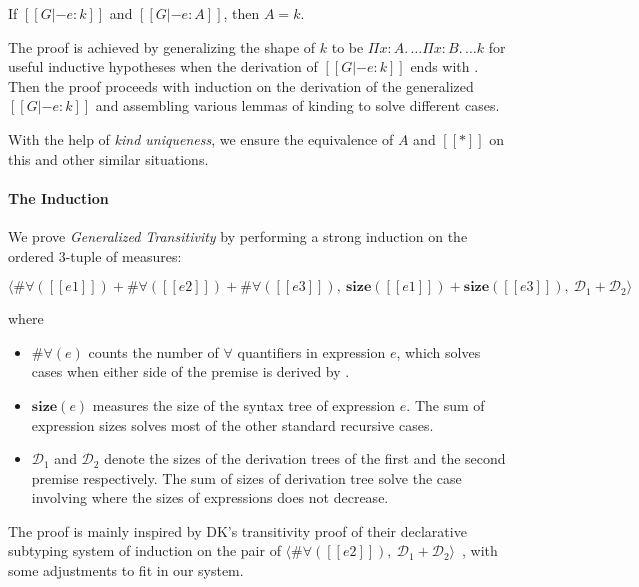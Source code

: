 \begin{theorem}
    If $[[G |- e : k]]$ and $[[G |- e : A]]$,
    then $A = k$.
\end{theorem}

\noindent The proof is achieved by generalizing the shape of $k$ to be
$\Pi x : A.\, \dots \Pi x : B.\, \dots k$ for useful inductive hypotheses
when the derivation of $[[G |- e : k]]$ ends with . Then the proof
proceeds with induction on the derivation of the generalized $[[G |- e : k]]$ and
assembling various lemmas of kinding to solve different cases.

With the help of \emph{kind uniqueness},
we ensure the equivalence of $A$ and $[[*]]$ on this and other similar situations.

\paragraph{The Induction}

We prove \emph{Generalized Transitivity} by performing a strong induction on
the ordered 3-tuple of measures:

$$
\langle \#\forall([[e1]]) + \#\forall([[e2]]) + \#\forall([[e3]]), ~
\mathbf{size}([[e1]]) + \mathbf{size}([[e3]]), ~
\mathcal{D}_1 + \mathcal{D}_2 \rangle
$$

\noindent where

\begin{itemize}
    \item $\#\forall(e)$ counts the number of $\forall$ quantifiers
    in expression $e$, which solves cases when either side of the premise is
    derived by .
    \item $\mathbf{size}(e)$ measures the size of the syntax tree of
    expression $e$. The sum of expression sizes solves most of the other
    standard recursive cases.
    \item $\mathcal{D}_1$ and $\mathcal{D}_2$ denote the sizes of the derivation
    trees of the first and the second premise respectively. The sum of sizes
    of derivation tree solve the case involving  where the sizes of
    expressions does not decrease.
\end{itemize}

The proof is mainly inspired by DK's transitivity proof of their declarative subtyping
system of induction on the pair of
$\langle \#\forall([[e2]]) ,~ \mathcal{D}_1 + \mathcal{D}_2 \rangle$~\cite{dunfield2013lemmas},
with some adjustments to fit in our system.

